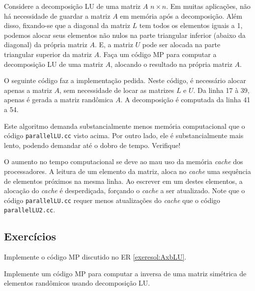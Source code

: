 \begin{exeresol}\label{exeresol:parallelLU2}
  Considere a decomposição LU de uma matriz $A$ $n\times n$. Em muitas aplicações, não há necessidade de guardar a matriz $A$ em memória após a decomposição. Além disso, fixando-se que a diagonal da matriz $L$ tem todos os elementos iguais a 1, podemos alocar seus elementos não nulos na parte triangular inferior (abaixo da diagonal) da própria matriz $A$. E, a matriz $U$ pode ser alocada na parte triangular superior da matriz $A$. Faça um código MP para computar a decomposição LU de uma matriz $A$, alocando o resultado na própria matriz $A$.
\end{exeresol}
\begin{resol}
  O seguinte código faz a implementação pedida. Neste código, é necessário alocar apenas a matriz $A$, sem necessidade de locar as matrizes $L$ e $U$. Da linha 17 à 39, apenas é gerada a matriz randômica $A$. A decomposição é computada da linha 41 a 54.
  
  

  Este algoritmo demanda substancialmente menos memória computacional que o código \verb+parallelLU.cc+ visto acima. Por outro lado, ele é substancialmente mais lento, podendo demandar até o dobro de tempo. Verifique!

  O aumento no tempo computacional se deve ao mau uso da memória {\it cache} dos processadores. A leitura de um elemento da matriz, aloca no {\it cache} uma sequência de elementos próximos na mesma linha. Ao escrever em um destes elementos, a alocação do {\it cache} é desperdiçada, forçando o {\it cache} a ser atualizado. Note que o código \verb+parallelLU.cc+ requer menos atualizações do {\it cache} que o código \verb+parallelLU2.cc+.
\end{resol}

\subsection*{Exercícios}

\begin{exer}\label{exer:AxbLU}
  Implemente o código MP discutido no ER \ref{exeresol:AxbLU}.
\end{exer}

\begin{exer}
  Implemente um código MP para computar a inversa de uma matriz simétrica de elementos randômicos usando decomposição LU.
\end{exer}


